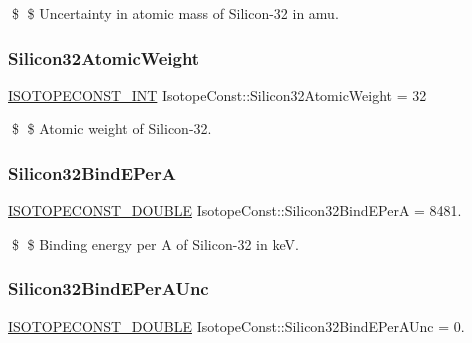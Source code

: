 \$ \$ Uncertainty in atomic mass of Silicon-\/32 in amu. \mbox{\label{group___isotope_const-_silicon-_si32_gabdbf1f127fc4648df65b11e8da08e7bb}} 
\subsubsection{\texorpdfstring{Silicon32\+Atomic\+Weight}{Silicon32AtomicWeight}}
{\footnotesize\ttfamily \mbox{\hyperlink{group___isotope_const-_macros_ga5f18360b3e99483a35c32d789e62621c}{I\+S\+O\+T\+O\+P\+E\+C\+O\+N\+S\+T\+\_\+\+I\+NT}} Isotope\+Const\+::\+Silicon32\+Atomic\+Weight = 32}

\$ \$ Atomic weight of Silicon-\/32. \mbox{\label{group___isotope_const-_silicon-_si32_gae7a637018f25af359bc13c1c0ce36161}} 
\subsubsection{\texorpdfstring{Silicon32\+Bind\+E\+PerA}{Silicon32BindEPerA}}
{\footnotesize\ttfamily \mbox{\hyperlink{group___isotope_const-_macros_ga8f45a7272ce02c0b4c65c44636ed719a}{I\+S\+O\+T\+O\+P\+E\+C\+O\+N\+S\+T\+\_\+\+D\+O\+U\+B\+LE}} Isotope\+Const\+::\+Silicon32\+Bind\+E\+PerA = 8481.}

\$ \$ Binding energy per A of Silicon-\/32 in keV. \mbox{\label{group___isotope_const-_silicon-_si32_ga219930d12c5e29a854f63ba4ee0e0ef8}} 
\subsubsection{\texorpdfstring{Silicon32\+Bind\+E\+Per\+A\+Unc}{Silicon32BindEPerAUnc}}
{\footnotesize\ttfamily \mbox{\hyperlink{group___isotope_const-_macros_ga8f45a7272ce02c0b4c65c44636ed719a}{I\+S\+O\+T\+O\+P\+E\+C\+O\+N\+S\+T\+\_\+\+D\+O\+U\+B\+LE}} Isotope\+Const\+::\+Silicon32\+Bind\+E\+Per\+A\+Unc = 0.}


